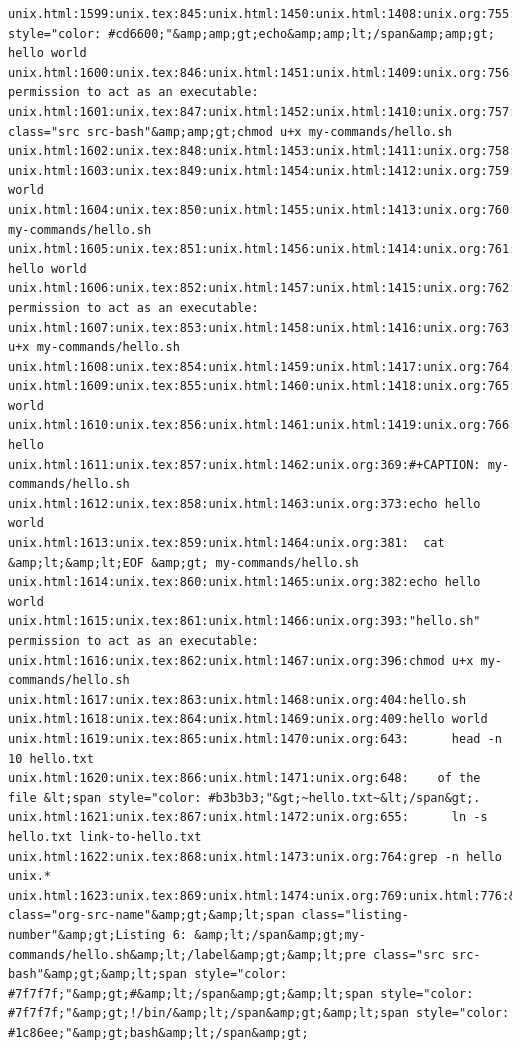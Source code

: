 \documentclass[11pt]{article}
\begin{document}
\begin{verbatim}
unix.html:1599:unix.tex:845:unix.html:1450:unix.html:1408:unix.org:755:unix.html:778:&amp;amp;lt;span style="color: #cd6600;"&amp;amp;gt;echo&amp;amp;lt;/span&amp;amp;gt; hello world
unix.html:1600:unix.tex:846:unix.html:1451:unix.html:1409:unix.org:756:unix.html:785:"hello.sh" permission to act as an executable:
unix.html:1601:unix.tex:847:unix.html:1452:unix.html:1410:unix.org:757:unix.html:789:&amp;amp;lt;pre class="src src-bash"&amp;amp;gt;chmod u+x my-commands/hello.sh
unix.html:1602:unix.tex:848:unix.html:1453:unix.html:1411:unix.org:758:unix.html:799:hello.sh
unix.html:1603:unix.tex:849:unix.html:1454:unix.html:1412:unix.org:759:unix.html:808:hello world
unix.html:1604:unix.tex:850:unix.html:1455:unix.html:1413:unix.org:760:unix.org:344:#+CAPTION: my-commands/hello.sh
unix.html:1605:unix.tex:851:unix.html:1456:unix.html:1414:unix.org:761:unix.org:348:echo hello world
unix.html:1606:unix.tex:852:unix.html:1457:unix.html:1415:unix.org:762:unix.org:353:"hello.sh" permission to act as an executable:
unix.html:1607:unix.tex:853:unix.html:1458:unix.html:1416:unix.org:763:unix.org:356:chmod u+x my-commands/hello.sh
unix.html:1608:unix.tex:854:unix.html:1459:unix.html:1417:unix.org:764:unix.org:368:hello.sh
unix.html:1609:unix.tex:855:unix.html:1460:unix.html:1418:unix.org:765:unix.org:373:hello world
unix.html:1610:unix.tex:856:unix.html:1461:unix.html:1419:unix.org:766:unix.org:643:grep hello 
unix.html:1611:unix.tex:857:unix.html:1462:unix.org:369:#+CAPTION: my-commands/hello.sh
unix.html:1612:unix.tex:858:unix.html:1463:unix.org:373:echo hello world
unix.html:1613:unix.tex:859:unix.html:1464:unix.org:381:  cat &amp;lt;&amp;lt;EOF &amp;gt; my-commands/hello.sh
unix.html:1614:unix.tex:860:unix.html:1465:unix.org:382:echo hello world
unix.html:1615:unix.tex:861:unix.html:1466:unix.org:393:"hello.sh" permission to act as an executable:
unix.html:1616:unix.tex:862:unix.html:1467:unix.org:396:chmod u+x my-commands/hello.sh
unix.html:1617:unix.tex:863:unix.html:1468:unix.org:404:hello.sh
unix.html:1618:unix.tex:864:unix.html:1469:unix.org:409:hello world
unix.html:1619:unix.tex:865:unix.html:1470:unix.org:643:      head -n 10 hello.txt
unix.html:1620:unix.tex:866:unix.html:1471:unix.org:648:    of the file &lt;span style="color: #b3b3b3;"&gt;~hello.txt~&lt;/span&gt;.
unix.html:1621:unix.tex:867:unix.html:1472:unix.org:655:      ln -s hello.txt link-to-hello.txt
unix.html:1622:unix.tex:868:unix.html:1473:unix.org:764:grep -n hello unix.*
unix.html:1623:unix.tex:869:unix.html:1474:unix.org:769:unix.html:776:&amp;lt;label class="org-src-name"&amp;gt;&amp;lt;span class="listing-number"&amp;gt;Listing 6: &amp;lt;/span&amp;gt;my-commands/hello.sh&amp;lt;/label&amp;gt;&amp;lt;pre class="src src-bash"&amp;gt;&amp;lt;span style="color: #7f7f7f;"&amp;gt;#&amp;lt;/span&amp;gt;&amp;lt;span style="color: #7f7f7f;"&amp;gt;!/bin/&amp;lt;/span&amp;gt;&amp;lt;span style="color: #1c86ee;"&amp;gt;bash&amp;lt;/span&amp;gt;

\end{verbatim}
\end{document}
